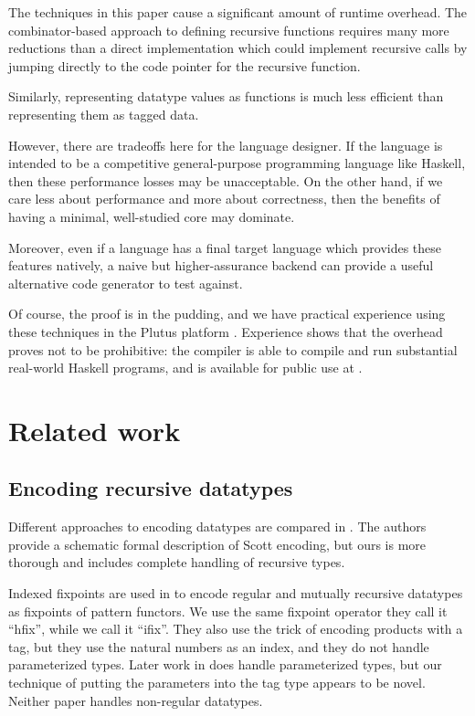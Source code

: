 The techniques in this paper cause a significant amount of runtime overhead. The
combinator-based approach to defining recursive functions requires many more
reductions than a direct implementation which could implement recursive calls
by jumping directly to the code pointer for the recursive function.

Similarly, representing datatype values as functions is much less efficient than
representing them as tagged data.

However, there are tradeoffs here for the language designer. If the language is
intended to be a competitive general-purpose programming language like Haskell,
then these performance losses may be unacceptable. On the other hand, if we care
less about performance and more about correctness, then the benefits of having a
minimal, well-studied core may dominate.

Moreover, even if a language has a final target language which
provides these features natively, a naive but higher-assurance backend can
provide a useful alternative code generator to test against.

Of course, the proof is in the pudding, and we have practical experience using
these techniques in the Plutus platform \cite{plutusgithub}. Experience shows
that the overhead proves not to be prohibitive: the compiler is able to compile and run substantial
real-world Haskell programs, and is available for public use at \cite{plutusplayground}.

\section{Related work}

\subsection{Encoding recursive datatypes}

Different approaches to encoding datatypes are compared in \cite{scott}. The
authors provide a schematic formal description of Scott encoding, but ours is
more thorough and includes complete handling of recursive types.

Indexed fixpoints are used in \cite{fixmutualgeneric} to
encode regular and mutually recursive datatypes as fixpoints of pattern
functors. We use the same fixpoint operator \textemdash{} they call it ``hfix'',
while we call it ``ifix''. They also use the trick of encoding products with a tag,
but they use the natural numbers as an index, and they do not handle
parameterized types. Later work in \cite{loh2011generic} does handle
parameterized types, but our technique of putting the parameters into the tag
type appears to be novel. Neither paper handles non-regular datatypes.

